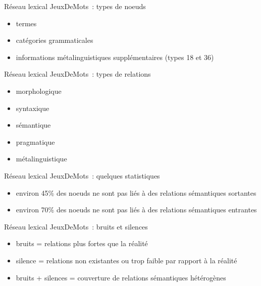 \documentclass{beamer}
\begin{document}
\begin{frame}
  Réseau lexical JeuxDeMots~: types de noeuds
  \begin{itemize}
  \item termes
  \item catégories grammaticales
  \item informations métalinguistiques supplémentaires (types 18 et 36)
  \end{itemize}
\end{frame}

\begin{frame}
  Réseau lexical JeuxDeMots~: types de relations
  \begin{itemize}
  \item morphologique
  \item syntaxique
  \item sémantique
  \item pragmatique
  \item métalinguistique
  \end{itemize}
\end{frame}

\begin{frame}
  Réseau lexical JeuxDeMots~: quelques statistiques
  \begin{itemize}
  \item environ 45\% des noeuds ne sont pas liés à des relations sémantiques sortantes
  \item environ 70\% des noeuds ne sont pas liés à des relations sémantiques entrantes
  \end{itemize}
\end{frame}

\begin{frame}
  Réseau lexical JeuxDeMots~: bruits et silences
  \begin{itemize}
  \item bruits = relations plus fortes que la réalité 
  \item silence = relations non existantes ou trop faible par rapport à la réalité 
  \item bruits + silences = couverture de relations sémantiques hétérogènes
  \end{itemize}
\end{frame}
\end{document}
